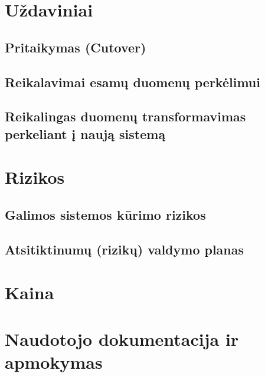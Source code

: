\documentclass[12pt]{article}
\begin{document}
\newpage

\section{Uždaviniai}
\subsection{Pritaikymas (Cutover)}

\subsection{Reikalavimai esamų duomenų perkėlimui}

\subsection{Reikalingas duomenų transformavimas perkeliant į naują sistemą}

\newpage

\section{Rizikos}
\subsection{Galimos sistemos kūrimo rizikos}

\subsection{Atsitiktinumų (rizikų) valdymo planas}

\newpage

\section{Kaina}

\section{Naudotojo dokumentacija ir apmokymas}




\end{document}
